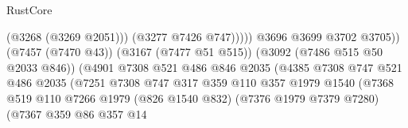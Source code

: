 \begin{lexlean}{RustCore}
\begin{coremodule}
                                                              (@3268 (@3269 @2051)))
                                                            (@3277 @7426 @747)))))
                                                    @3696
                                                    @3699
                                                    @3702
                                                    @3705))
                                                (@7457 (@7470 @43))
                                                (@3167 (@7477 @51 @515))
                                                (@3092 (@7486 @515 @50 @2033 @846))
                                                (@4901
                                                  @7308
                                                  @521
                                                  @486
                                                  @846
                                                  @2035
                                                  (@4385
                                                    @7308
                                                    @747
                                                    @521
                                                    @486
                                                    @2035
                                                    (@7251
                                                      @7308
                                                      @747
                                                      @317
                                                      @359
                                                      @110
                                                      @357
                                                      @1979
                                                      @1540
                                                      (@7368
                                                        @519
                                                        @110
                                                        @7266
                                                        @1979
                                                        (@826 @1540 @832)
                                                        (@7376 @1979 @7379 @7280)
                                                        (@7367
                                                          @359
                                                          @86
                                                          @357
                                                          @14

\end{coremodule}
\end{lexlean}

